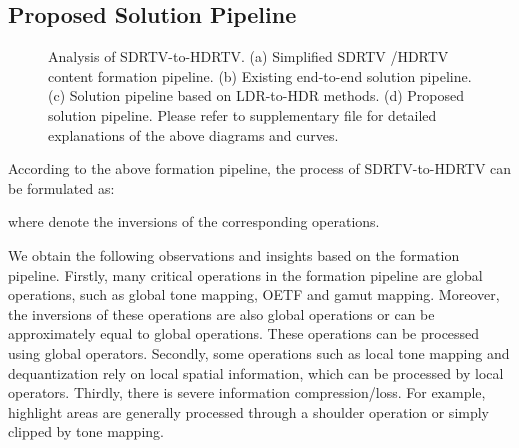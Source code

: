 \documentclass[10pt,twocolumn,letterpaper]{article}
\begin{document}
\subsection{Proposed Solution Pipeline}
\begin{figure}[!t]
\centering

\caption{Analysis of SDRTV-to-HDRTV. (a) Simplified SDRTV
 /HDRTV content formation pipeline. (b) Existing end-to-end solution pipeline. (c) Solution pipeline based on LDR-to-HDR methods. (d) Proposed solution pipeline. Please refer to supplementary file for detailed explanations of the above diagrams and curves.}
\label{Figure 1 image pipeline}
\vspace{-7pt}
\end{figure}

According to the above formation pipeline, the process of SDRTV-to-HDRTV can be formulated as:
 
where  denote the inversions of the corresponding operations. 

We obtain the following observations and insights based on the formation pipeline. Firstly, many critical operations in the formation pipeline are global operations, such as global tone mapping, OETF and gamut mapping. Moreover, the inversions of these operations are also global operations or can be approximately equal to global operations. These operations can be processed using global operators. Secondly, some operations such as local tone mapping and dequantization rely on local spatial information, which can be processed by local operators. Thirdly, there is severe information compression/loss. For example, highlight areas are generally processed through a shoulder operation or simply clipped by tone mapping. 
\end{document}
